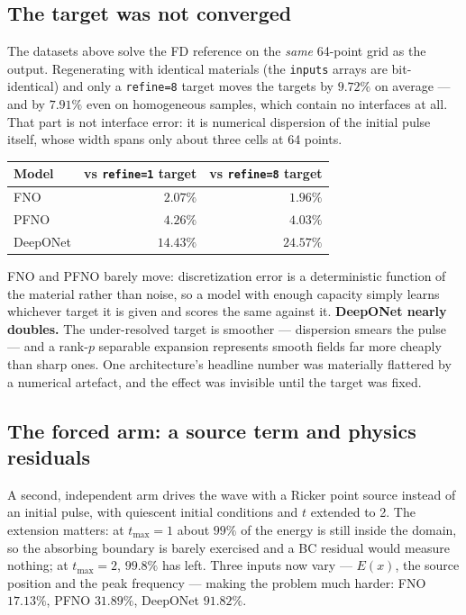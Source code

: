 \documentclass[11pt,a4paper]{article}
\begin{document}
\subsection{The target was not converged}
\label{sec:converged}

The datasets above solve the FD reference on the \emph{same} 64-point grid as
the output. Regenerating with identical materials (the \texttt{inputs} arrays
are bit-identical) and only a \texttt{refine=8} target moves the targets by
$9.72\%$ on average --- and by $7.91\%$ even on homogeneous samples, which
contain no interfaces at all. That part is not interface error: it is numerical
dispersion of the initial pulse itself, whose width spans only about three cells
at 64 points.

\begin{center}
\small
\begin{tabular}{lrr}
\toprule
\textbf{Model} & \textbf{vs \texttt{refine=1} target} & \textbf{vs \texttt{refine=8} target}\\
\midrule
FNO      & $2.07\%$  & $\mathbf{1.96\%}$\\
PFNO     & $4.26\%$  & $\mathbf{4.03\%}$\\
DeepONet & $14.43\%$ & $\mathbf{24.57\%}$\\
\bottomrule
\end{tabular}
\end{center}

FNO and PFNO barely move: discretization error is a deterministic function of
the material rather than noise, so a model with enough capacity simply learns
whichever target it is given and scores the same against it. \textbf{DeepONet
nearly doubles.} The under-resolved target is smoother --- dispersion smears the
pulse --- and a rank-$p$ separable expansion represents smooth fields far more
cheaply than sharp ones. One architecture's headline number was materially
flattered by a numerical artefact, and the effect was invisible until the target
was fixed.

\subsection{The forced arm: a source term and physics residuals}

A second, independent arm drives the wave with a Ricker point source instead of
an initial pulse, with quiescent initial conditions and $t$ extended to 2. The
extension matters: at $t_{\max}=1$ about $99\%$ of the energy is still inside
the domain, so the absorbing boundary is barely exercised and a BC residual
would measure nothing; at $t_{\max}=2$, $99.8\%$ has left. Three inputs now
vary --- $E(x)$, the source position and the peak frequency --- making the
problem much harder: FNO $17.13\%$, PFNO $31.89\%$, DeepONet $91.82\%$.
\end{document}
